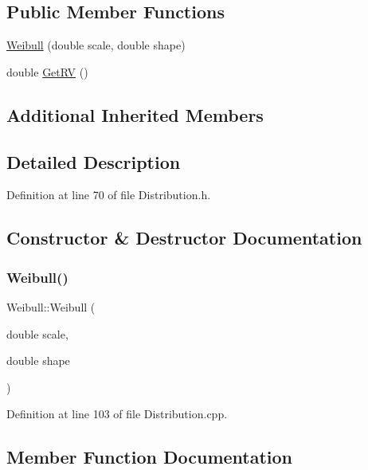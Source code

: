 \subsection*{Public Member Functions}
\begin{DoxyCompactItemize}
\item 
\hyperlink{class_weibull_a7c0e76986a3e34d64614c155020fb362}{Weibull} (double scale, double shape)
\item 
double \hyperlink{class_weibull_a0de3910ff51aeb87c49ccb5d34d1de0d}{Get\+RV} ()
\end{DoxyCompactItemize}
\subsection*{Additional Inherited Members}


\subsection{Detailed Description}


Definition at line 70 of file Distribution.\+h.



\subsection{Constructor \& Destructor Documentation}
\mbox{\label{class_weibull_a7c0e76986a3e34d64614c155020fb362}} 
\subsubsection{\texorpdfstring{Weibull()}{Weibull()}}
{\footnotesize\ttfamily Weibull\+::\+Weibull (\begin{DoxyParamCaption}\item[{double}]{scale,  }\item[{double}]{shape }\end{DoxyParamCaption})}



Definition at line 103 of file Distribution.\+cpp.



\subsection{Member Function Documentation}
\mbox{\label{class_weibull_a0de3910ff51aeb87c49ccb5d34d1de0d}} 
